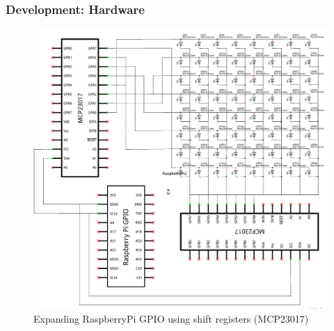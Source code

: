 \documentclass{beamer}
\begin{document}
\begin{frame}
\frametitle{Development: Hardware}

\begin{figure}
	\includegraphics[scale=0.1]{images/circuit_diagram.jpg}
	\caption{Expanding RaspberryPi GPIO using shift registers (MCP23017)}
\end{figure}

\end{frame}
\end{document}
